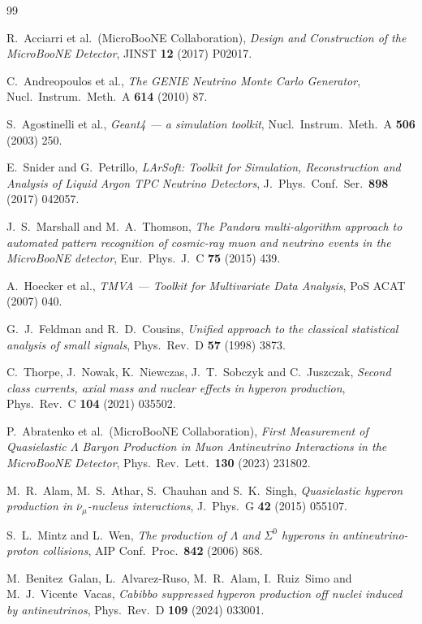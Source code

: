 \documentclass[12pt,a4paper]{article}
\begin{document}
\begin{thebibliography}{99}

  R.~Acciarri et al.\ (MicroBooNE Collaboration),
  \textit{Design and Construction of the MicroBooNE Detector},
  JINST \textbf{12} (2017) P02017.

  C.~Andreopoulos et al.,
  \textit{The GENIE Neutrino Monte Carlo Generator},
  Nucl.\ Instrum.\ Meth.\ A \textbf{614} (2010) 87.

  S.~Agostinelli et al.,
  \textit{Geant4 --- a simulation toolkit},
  Nucl.\ Instrum.\ Meth.\ A \textbf{506} (2003) 250.

  E.~Snider and G.~Petrillo,
  \textit{LArSoft: Toolkit for Simulation, Reconstruction and Analysis
  of Liquid Argon TPC Neutrino Detectors},
  J.~Phys.\ Conf.\ Ser.\ \textbf{898} (2017) 042057.

  J.~S.~Marshall and M.~A.~Thomson,
  \textit{The Pandora multi-algorithm approach to automated pattern
  recognition of cosmic-ray muon and neutrino events in the MicroBooNE
  detector},
  Eur.~Phys.\ J.\ C \textbf{75} (2015) 439.

  A.~Hoecker et al.,
  \textit{TMVA --- Toolkit for Multivariate Data Analysis},
  PoS ACAT (2007) 040.

  G.~J.~Feldman and R.~D.~Cousins,
  \textit{Unified approach to the classical statistical analysis of small signals},
  Phys.\ Rev.\ D \textbf{57} (1998) 3873.

  C.~Thorpe, J.~Nowak, K.~Niewczas, J.~T.~Sobczyk and C.~Juszczak,
  \textit{Second class currents, axial mass and nuclear effects in
  hyperon production},
  Phys.\ Rev.\ C \textbf{104} (2021) 035502.

  P.~Abratenko et al.\ (MicroBooNE Collaboration),
  \textit{First Measurement of Quasielastic $\Lambda$ Baryon Production
  in Muon Antineutrino Interactions in the MicroBooNE Detector},
  Phys.\ Rev.\ Lett.\ \textbf{130} (2023) 231802.

  M.~R.~Alam, M.~S.~Athar, S.~Chauhan and S.~K.~Singh,
  \textit{Quasielastic hyperon production in $\bar\nu_\mu$-nucleus
  interactions},
  J.~Phys.\ G \textbf{42} (2015) 055107.

  S.~L.~Mintz and L.~Wen,
  \textit{The production of $\Lambda$ and $\Sigma^0$ hyperons in
  antineutrino-proton collisions},
  AIP Conf.\ Proc.\ \textbf{842} (2006) 868.

  M.~Benitez~Galan, L.~Alvarez-Ruso, M.~R.~Alam,
  I.~Ruiz~Simo and M.~J.~Vicente~Vacas,
  \textit{Cabibbo suppressed hyperon production off nuclei induced
  by antineutrinos},
  Phys.\ Rev.\ D \textbf{109} (2024) 033001.

\end{thebibliography}
\end{document}
